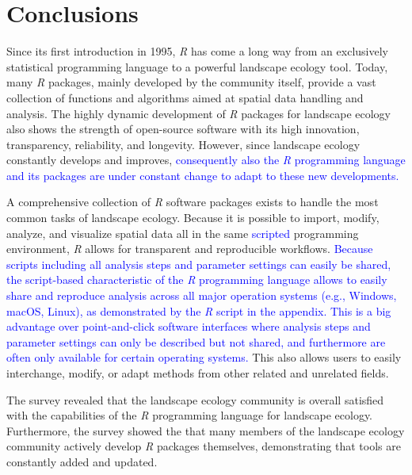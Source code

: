 \documentclass[smallextended]{svjour3}       %
\begin{document}
\hypertarget{conclusions}{%
\section{Conclusions}\label{conclusions}}

Since its first introduction in 1995, \textit{R} has come a long way from an exclusively statistical programming language to a powerful landscape ecology tool.
Today, many \textit{R} packages, mainly developed by the community itself, provide a vast collection of functions and algorithms aimed at spatial data handling and analysis.
The highly dynamic development of \textit{R} packages for landscape ecology also shows the strength of open-source software with its high innovation, transparency, reliability, and longevity.
However, since landscape ecology constantly develops and improves, \textcolor{blue}{consequently also the \textit{R} programming language and its packages are under constant change to adapt to these new developments.}

A comprehensive collection of \textit{R} software packages exists to handle the most common tasks of landscape ecology.
Because it is possible to import, modify, analyze, and visualize spatial data all in the same \textcolor{blue}{scripted} programming environment, \textit{R} allows for transparent and reproducible workflows.
\textcolor{blue}{Because scripts including all analysis steps and parameter settings can easily be shared, the script-based characteristic of the \textit{R} programming language allows to easily share and reproduce analysis across all major operation systems (e.g., Windows, macOS, Linux), as demonstrated by the \textit{R} script in the appendix.
This is a big advantage over point-and-click software interfaces where analysis steps and parameter settings can only be described but not shared, and furthermore are often only available for certain operating systems.}
This also allows users to easily interchange, modify, or adapt methods from other related and unrelated fields.

The survey revealed that the landscape ecology community is overall satisfied with the capabilities of the \textit{R} programming language for landscape ecology.
Furthermore, the survey showed the that many members of the landscape ecology community actively develop \textit{R} packages themselves, demonstrating that tools are constantly added and updated.
\end{document}
